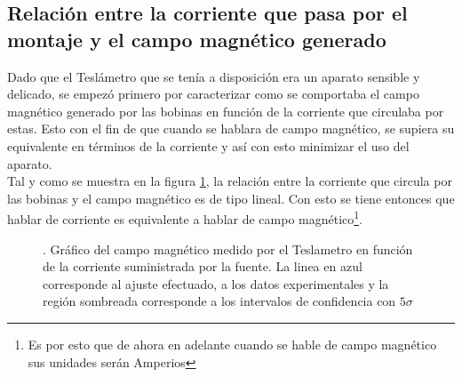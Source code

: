 \documentclass[%
 reprint,
 amsmath,amssymb,
 aps,
]{revtex4-1}
\begin{document}
\subsection{Relación entre la corriente que pasa por el montaje y el campo magnético generado}
Dado que el Teslámetro que se tenía a disposición era un aparato sensible y delicado, se empezó primero por caracterizar como se comportaba el campo magnético generado por las bobinas en función de la corriente que circulaba por estas. Esto con el fin de que cuando se hablara de campo magnético, se supiera su equivalente en términos de la corriente y así con esto minimizar el uso del aparato.\\
Tal y como se muestra en la figura \ref{Calibracion}, la relación entre la corriente que circula por las bobinas y el campo magnético es de tipo lineal. Con esto se tiene entonces que hablar de corriente es equivalente a hablar de campo magnético\footnote{Es por esto que de ahora en adelante cuando se hable de campo magnético sus unidades serán Amperios}.

\begin{figure}[h]
\caption{\label{Calibracion}. Gráfico del campo magnético medido por el Teslametro en función de la corriente suministrada por la fuente. La linea en azul corresponde al ajuste efectuado, a los datos experimentales y la región sombreada corresponde a los intervalos de confidencia con $5\sigma$}
\end{figure}
\end{document}
